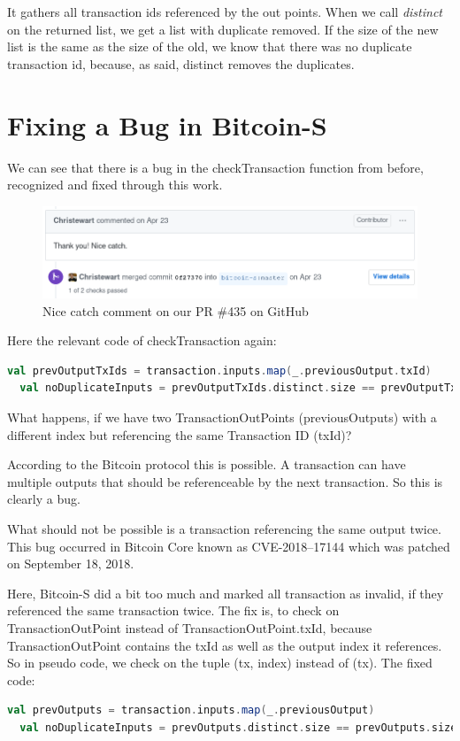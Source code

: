 It gathers all transaction ids referenced by the out points.
When we call \emph{distinct} on the returned list, we get a list with duplicate removed.
If the size of the new list is the same as the size of the old, we know that there was no duplicate transaction id, because, as said, distinct removes the duplicates.


\section{Fixing a Bug in Bitcoin-S}
\label{sec:bugfix}

We can see that there is a bug in the checkTransaction function from before, recognized and fixed through this work.

\begin{figure}[H]
	\centering
		\includegraphics[scale=0.5]{images/bitcoin-s-pr-comment.png}
	\caption{Nice catch comment on our PR \#435 on GitHub}
	\label{fig:output1}
\end{figure}

Here the relevant code of checkTransaction again:
\begin{lstlisting}[language=scala]
  val prevOutputTxIds = transaction.inputs.map(_.previousOutput.txId)
  val noDuplicateInputs = prevOutputTxIds.distinct.size == prevOutputTxIds.size
\end{lstlisting}

What happens, if we have two TransactionOutPoints (previousOutputs) with a different index but referencing the same Transaction ID (txId)?

According to the Bitcoin protocol this is possible.
A transaction can have multiple outputs that should be referenceable by the next transaction.
So this is clearly a bug.

What should not be possible is a transaction referencing the same output twice.
This bug occurred in Bitcoin Core known as CVE-2018–17144 which was patched on September 18, 2018. \cite{cve201817144}

Here, Bitcoin-S did a bit too much and marked all transaction as invalid, if they referenced the same transaction twice.
The fix is, to check on TransactionOutPoint instead of TransactionOutPoint.txId, because TransactionOutPoint contains the txId as well as the output index it references.
So in pseudo code, we check on the tuple (tx, index) instead of (tx).
The fixed code:
\begin{lstlisting}[language=scala]
  val prevOutputs = transaction.inputs.map(_.previousOutput)
  val noDuplicateInputs = prevOutputs.distinct.size == prevOutputs.size
\end{lstlisting}


